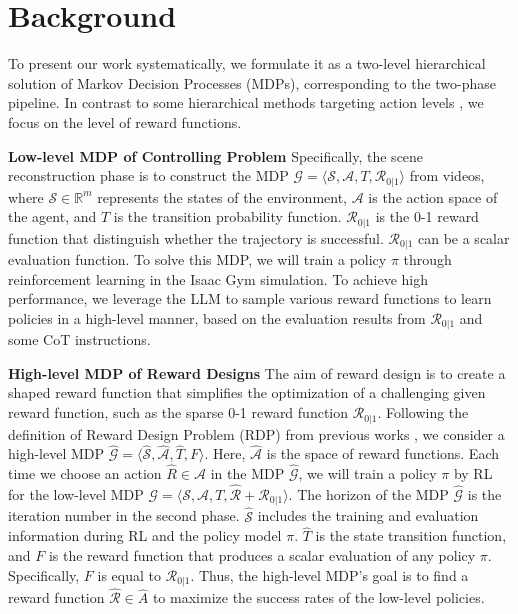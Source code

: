 \section{Background}
\label{sec:background}

To present our work systematically, we formulate it as a two-level hierarchical solution of Markov Decision Processes (MDPs), corresponding to the two-phase pipeline. In contrast to some hierarchical methods targeting action levels \citep{mcgovern1998hierarchical, hauskrecht2013hierarchical}, we focus on the level of reward functions.

\textbf{Low-level MDP of Controlling Problem}
Specifically, the scene reconstruction phase is to construct the MDP $\mathcal{G} = \langle \mathcal{S}, \mathcal{A}, T, \mathcal{R}_{0|1} \rangle$ from videos, where $\mathcal{S} \in \mathbb{R}^m$ represents the states of the environment, $\mathcal{A}$ is the action space of the agent, and $T$ is the transition probability function. 
$\mathcal{R}_{0|1}$ is the 0-1 reward function that distinguish whether the trajectory is successful. $\mathcal{R}_{0|1}$ can be a scalar evaluation function. 
To solve this MDP, we will train a policy $\pi$ through reinforcement learning in the Isaac Gym simulation. To achieve high performance, we leverage the LLM to sample various reward functions to learn policies in a high-level manner, based on the evaluation results from $\mathcal{R}_{0|1}$ and some CoT \citep{wei2022chain} instructions.

\textbf{High-level MDP of Reward Designs} The aim of reward design is to create a shaped reward function that simplifies the optimization of a challenging given reward function, such as the sparse 0-1 reward function $\mathcal{R}_{0|1}$. Following the definition of Reward Design Problem (RDP) from previous works \citep{singh2009rewards, ma2023eureka}, we consider a high-level MDP $\hat{\mathcal{G}} = \langle \hat{\mathcal{S}}, \hat{\mathcal{A}}, \hat{T}, F \rangle$. Here, $\hat{\mathcal{A}}$ is the space of reward functions. Each time we choose an action $\hat{R} \in \mathcal{A}$ in the MDP $\hat{\mathcal{G}}$, we will train a policy $\pi$ by RL for the low-level MDP $\mathcal{G} = \langle \mathcal{S}, \mathcal{A}, T, \hat{\mathcal{R}} + \mathcal{R}_{0|1} \rangle$. The horizon of the MDP $\hat{\mathcal{G}}$ is the iteration number in the second phase.
$\hat{\mathcal{S}}$ includes the training and evaluation information during RL and the policy model $\pi$. $\hat{T}$ is the state transition function, and $F$ is the reward function that produces a scalar evaluation of any policy $\pi$. Specifically, $F$ is equal to $\mathcal{R}_{0|1}$. Thus, the high-level MDP's goal is to find a reward function $\hat{\mathcal{R}} \in \hat{A}$ to maximize the success rates of the low-level policies.
